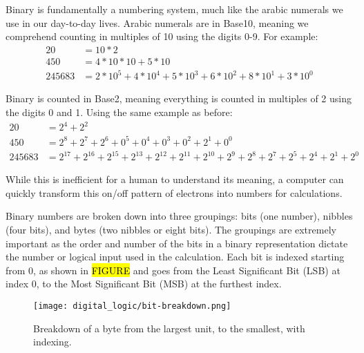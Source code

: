 Binary is fundamentally a numbering system, much like the arabic numerals we use in our day-to-day lives.
Arabic numerals are in Base10, meaning we comprehend counting in multiples of 10 using the digits 0-9. For example:
\begin{align*}
    20     &= 10*2 \\
    450    &= 4*10*10 + 5*10 \\
    245683 &= 2*10^5 + 4*10^4 + 5*10^3 + 6*10^2 + 8*10^1 + 3*10^0
\end{align*}

Binary is counted in Base2, meaning everything is counted in multiples of 2 using the digits 0 and 1. Using the same example as before:
\begin{align*}
    20     &= 2^4 + 2^2 \\
    450    &= 2^8 + 2^7 + 2^6 + 0^5 + 0^4 + 0^3 + 0^2 + 2^1 + 0^0 \\
    245683 &= 2^{17} + 2^{16} + 2^{15} + 2^{13} + 2^{12} + 2^{11} + 2^{10} + 2^9 + 2^8 + 2^7 + 2^5 + 2^4 + 2^1 + 2^0
\end{align*}
        
While this is inefficient for a human to understand its meaning, a computer can quickly transform this on/off pattern of electrons into numbers for calculations.

Binary numbers are broken down into three groupings: bits (one number), nibbles (four bits), and bytes (two nibbles or eight bits). 
The groupings are extremely important as the order and number of the bits in a binary representation dictate the number or logical input used in the calculation.
Each bit is indexed starting from 0, as shown in \hl{FIGURE} and goes from the Least Significant Bit (LSB) at index 0, to the Most Significant Bit (MSB) at the furthest index. 

\begin{figure*}
    \texttt{[image: digital\_logic/bit-breakdown.png]}
    \caption[Byte Breakdown]{Breakdown of a byte from the largest unit, to the smallest, with indexing.}
\end{figure*}


